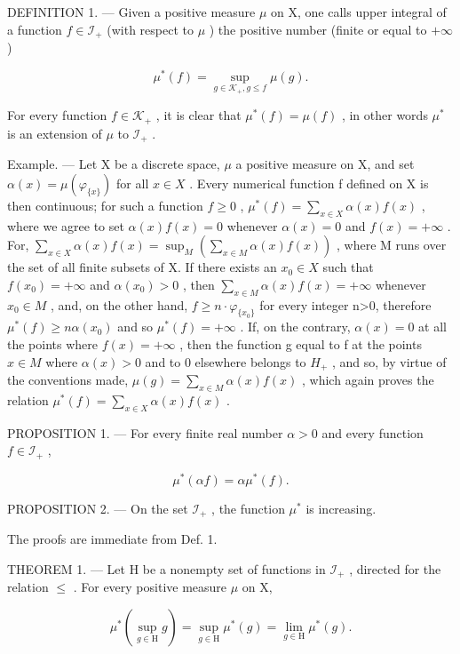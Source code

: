 DEFINITION 1. --- Given a positive measure \(\mu\) on X, one calls upper integral of a function \(f \in \mathcal{I}_{+}\) (with respect to \(\mu\) ) the positive number (finite or equal to \(+\infty\) )

\[
\mu^ {*} (f) = \sup _ {g \in \mathcal {K} _ {+}, g \leqslant f} \mu (g).
\]

For every function \(f \in \mathcal{K}_+\) , it is clear that \(\mu^*(f) = \mu(f)\) , in other words \(\mu^*\) is an extension of \(\mu\) to \(\mathcal{I}_+\) .

Example. --- Let X be a discrete space, \(\mu\) a positive measure on X, and set \(\alpha(x)=\mu(\varphi_{\{x\}})\) for all \(x\in X\) . Every numerical function f defined on X is then continuous; for such a function \(f\geqslant0\) , \(\mu^{*}(f)=\sum_{x\in X}\alpha(x)f(x)\) , where we agree to set \(\alpha(x)f(x)=0\) whenever \(\alpha(x)=0\) and \(f(x)=+\infty\) . For, \(\sum_{x\in X}\alpha(x)f(x)=\sup_{M}\left(\sum_{x\in M}\alpha(x)f(x)\right)\) , where M runs over the set of all finite subsets of X. If there exists an \(x_{0}\in X\) such that \(f(x_{0})=+\infty\) and \(\alpha(x_{0})>0\) , then \(\sum_{x\in M}\alpha(x)f(x)=+\infty\) whenever \(x_{0}\in M\) , and, on the other hand, \(f\geqslant n\cdot\varphi_{\{x_{0}\}}\) for every integer n\textgreater0, therefore \(\mu^{*}(f)\geqslant n\alpha(x_{0})\) and so \(\mu^{*}(f)=+\infty\) . If, on the contrary, \(\alpha(x)=0\) at all the points where \(f(x)=+\infty\) , then the function g equal to f at the points \(x\in M\) where \(\alpha(x)>0\) and to 0 elsewhere belongs to \(H_{+}\) , and so, by virtue of the conventions made, \(\mu(g)=\sum_{x\in M}\alpha(x)f(x)\) , which again proves the relation \(\mu^{*}(f)=\sum_{x\in X}\alpha(x)f(x)\) .

PROPOSITION 1. --- For every finite real number \(\alpha > 0\) and every function \(f \in \mathcal{I}_{+}\) ,

\[
\mu^ {*} (\alpha f) = \alpha \mu^ {*} (f).\tag{1}
\]

PROPOSITION 2. --- On the set \(\mathcal{I}_{+}\) , the function \(\mu^{*}\) is increasing.

The proofs are immediate from Def. 1.

THEOREM 1. --- Let H be a nonempty set of functions in \(\mathcal{I}_{+}\) , directed for the relation \(\leqslant\) . For every positive measure \(\mu\) on X,

\[
\mu^ {*} \left(\sup _ {g \in \mathrm{H}} g\right) = \sup _ {g \in \mathrm{H}} \mu^ {*} (g) = \lim _ {g \in \mathrm{H}} \mu^ {*} (g).\tag{2}
\]

